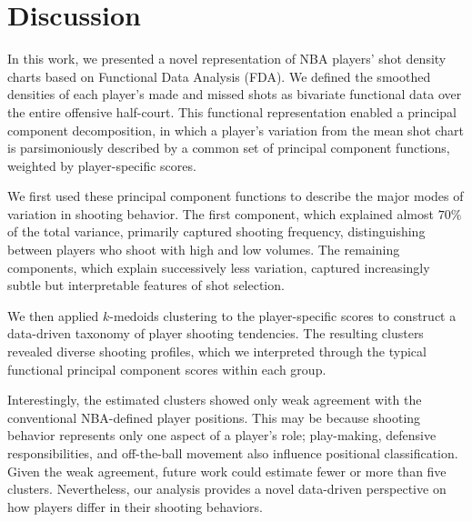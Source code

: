 \section{Discussion} %
\label{sec:discussion}

In this work, we presented a novel representation of NBA players’ shot density charts based on Functional Data Analysis (FDA). We defined the smoothed densities of each player’s made and missed shots as bivariate functional data over the entire offensive half-court. This functional representation enabled a principal component decomposition, in which a player’s variation from the mean shot chart is parsimoniously described by a common set of principal component functions, weighted by player-specific scores.

We first used these principal component functions to describe the major modes of variation in shooting behavior. The first component, which explained almost $70\%$ of the total variance, primarily captured shooting frequency, distinguishing between players who shoot with high and low volumes. The remaining components, which explain successively less variation, captured increasingly subtle but interpretable features of shot selection.

We then applied $k$-medoids clustering to the player-specific scores to construct a data-driven taxonomy of player shooting tendencies. The resulting clusters revealed diverse shooting profiles, which we interpreted through the typical functional principal component scores within each group.

Interestingly, the estimated clusters showed only weak agreement with the conventional NBA-defined player positions. This may be because shooting behavior represents only one aspect of a player’s role; play-making, defensive responsibilities, and off-the-ball movement also influence positional classification.
Given the weak agreement, future work could estimate fewer or more than five clusters.
Nevertheless, our analysis provides a novel data-driven perspective on how players differ in their shooting behaviors.

